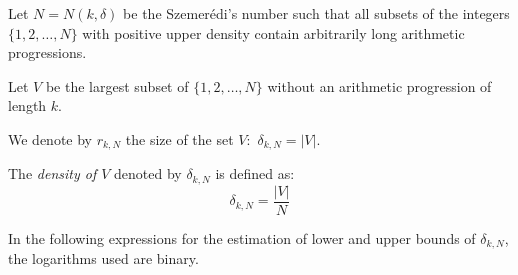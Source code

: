 \begin{defn} Let $N=N(k, \delta)$ be the Szemerédi's number such that all subsets of the integers $\{1,2,\ldots,N\}$ with positive upper density contain arbitrarily long arithmetic progressions. 

Let $V$ be the largest subset of $\{1,2,\ldots, N \}$ without an arithmetic progression of length $k.$

We denote by $r_{k,N}$ the size of the set $V:$ $\delta_{k,N}= |V|.$

The \textit{density of $V$} denoted by $\delta_{k,N}$ is defined as: $$\delta_{k,N}=\frac{|V|}{N}$$

\end{defn}


In the following expressions for the estimation of lower and upper bounds of $\delta_{k,N}$, the logarithms used are binary.
